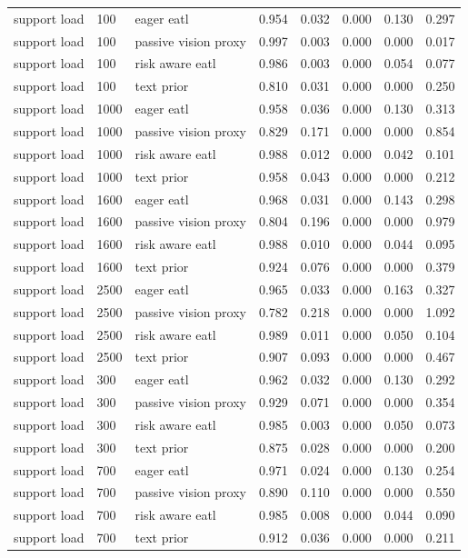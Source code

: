 \begin{longtable}{lllrrrrr}
support load & 100 & eager eatl & 0.954 & 0.032 & 0.000 & 0.130 & 0.297 \\
support load & 100 & passive vision proxy & 0.997 & 0.003 & 0.000 & 0.000 & 0.017 \\
support load & 100 & risk aware eatl & 0.986 & 0.003 & 0.000 & 0.054 & 0.077 \\
support load & 100 & text prior & 0.810 & 0.031 & 0.000 & 0.000 & 0.250 \\
support load & 1000 & eager eatl & 0.958 & 0.036 & 0.000 & 0.130 & 0.313 \\
support load & 1000 & passive vision proxy & 0.829 & 0.171 & 0.000 & 0.000 & 0.854 \\
support load & 1000 & risk aware eatl & 0.988 & 0.012 & 0.000 & 0.042 & 0.101 \\
support load & 1000 & text prior & 0.958 & 0.043 & 0.000 & 0.000 & 0.212 \\
support load & 1600 & eager eatl & 0.968 & 0.031 & 0.000 & 0.143 & 0.298 \\
support load & 1600 & passive vision proxy & 0.804 & 0.196 & 0.000 & 0.000 & 0.979 \\
support load & 1600 & risk aware eatl & 0.988 & 0.010 & 0.000 & 0.044 & 0.095 \\
support load & 1600 & text prior & 0.924 & 0.076 & 0.000 & 0.000 & 0.379 \\
support load & 2500 & eager eatl & 0.965 & 0.033 & 0.000 & 0.163 & 0.327 \\
support load & 2500 & passive vision proxy & 0.782 & 0.218 & 0.000 & 0.000 & 1.092 \\
support load & 2500 & risk aware eatl & 0.989 & 0.011 & 0.000 & 0.050 & 0.104 \\
support load & 2500 & text prior & 0.907 & 0.093 & 0.000 & 0.000 & 0.467 \\
support load & 300 & eager eatl & 0.962 & 0.032 & 0.000 & 0.130 & 0.292 \\
support load & 300 & passive vision proxy & 0.929 & 0.071 & 0.000 & 0.000 & 0.354 \\
support load & 300 & risk aware eatl & 0.985 & 0.003 & 0.000 & 0.050 & 0.073 \\
support load & 300 & text prior & 0.875 & 0.028 & 0.000 & 0.000 & 0.200 \\
support load & 700 & eager eatl & 0.971 & 0.024 & 0.000 & 0.130 & 0.254 \\
support load & 700 & passive vision proxy & 0.890 & 0.110 & 0.000 & 0.000 & 0.550 \\
support load & 700 & risk aware eatl & 0.985 & 0.008 & 0.000 & 0.044 & 0.090 \\
support load & 700 & text prior & 0.912 & 0.036 & 0.000 & 0.000 & 0.211 \\
\bottomrule
\end{longtable}
